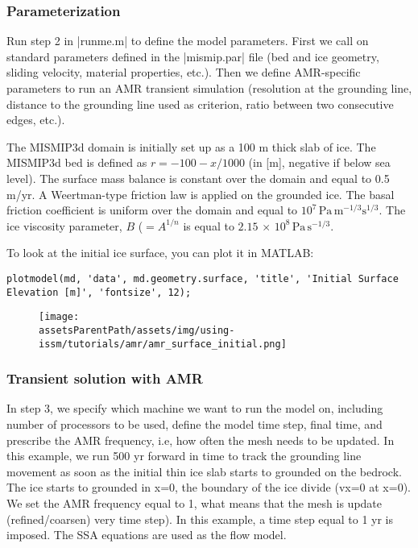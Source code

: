 \subsubsection{Parameterization}
Run step 2 in \lstinlinebg|runme.m| to define the model parameters. First we call on standard parameters defined in the \lstinlinebg|mismip.par| file (bed and ice geometry, sliding velocity, material properties, etc.). Then we define AMR-specific parameters to run an AMR transient simulation (resolution at the grounding line, distance to the grounding line used as criterion, ratio between two consecutive edges, etc.).

The MISMIP3d domain is initially set up as a 100 m thick slab of ice. The MISMIP3d bed is defined as $r=-100-x/1000$ (in [m], negative if below sea level). The surface mass balance is constant over the domain and equal to 0.5 m/yr. A Weertman-type friction law is applied on the grounded ice. The basal friction coefficient is uniform over the domain and equal to $10^{7}\,\textrm{Pa}\,\textrm{m}^{-1/3}\textrm{s}^{1/3}$. The ice viscosity parameter, $B$ ($=A^{1/n}$ is equal to $2.15 \, \times \, 10^{8}\,\textrm{Pa}\,\textrm{s}^{-1/3}$.

To look at the initial ice surface, you can plot it in MATLAB:
\begin{lstlisting}
plotmodel(md, 'data', md.geometry.surface, 'title', 'Initial Surface Elevation [m]', 'fontsize', 12);
\end{lstlisting}

\begin{figure}[H]
	\begin{center}
		\texttt{[image: \\assetsParentPath/assets/img/using-issm/tutorials/amr/amr\_surface\_initial.png]}
	\end{center}
\end{figure}

\subsubsection{Transient solution with AMR}
In step 3, we specify which machine we want to run the model on, including number of processors to be used, define the model time step, final time, and prescribe the AMR frequency, i.e, how often the mesh needs to be updated. In this example, we run 500 yr forward in time to track the grounding line movement as soon as the initial thin ice slab starts to grounded on the bedrock. The ice starts to grounded in x=0, the boundary of the ice divide (vx=0 at x=0). We set the AMR frequency equal to 1, what means that the mesh is update (refined/coarsen) very time step). In this example, a time step equal to 1 yr is imposed. The SSA equations are used as the flow model.

